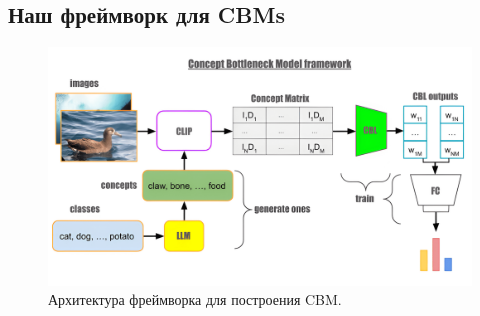 \subsection{Наш фреймворк для CBMs}
\label{sec:framework}
\begin{figure}[t]
\begin{center}
\centerline{\includegraphics[width=1.\columnwidth]{./figures/framework-compressed.png}}
\caption{Архитектура фреймворка для построения CBM.}
\label{fig:framework}
\end{center}
\end{figure}

